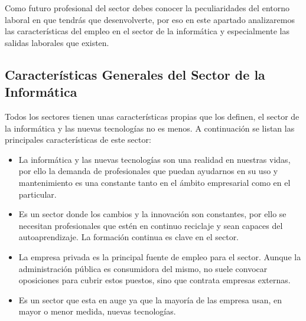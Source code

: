 Como futuro profesional del sector debes conocer la peculiaridades del entorno laboral en que tendrás que desenvolverte, por eso en este apartado analizaremos las características del empleo en el sector de la informática y especialmente las salidas laborales que existen.

\subsection{Características Generales del Sector de la Informática}
Todos los sectores tienen unas características propias que los definen, el sector de la informática y las nuevas tecnologías no es menos. A continuación se listan las principales características de este sector:

\begin{itemize}
    \item La informática y las nuevas tecnologías son una realidad en nuestras vidas, por ello la demanda de profesionales que puedan ayudarnos en su uso y mantenimiento es una constante tanto en el ámbito empresarial como en el particular.
    \item Es un sector donde los cambios y la innovación son constantes, por ello se necesitan profesionales que estén en continuo reciclaje y sean capaces del autoaprendizaje. La formación continua es clave en el sector.
    \item La empresa privada es la principal fuente de empleo para el sector. Aunque la administración pública es consumidora del mismo, no suele convocar oposiciones para cubrir estos puestos, sino que contrata empresas externas.
    \item Es un sector que esta en auge ya que la mayoría de las empresa usan, en mayor o menor medida, nuevas tecnologías.
\end{itemize}









\glsaddall
\printglossaries


\newpage
{}



